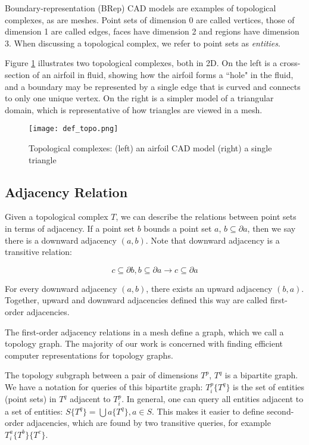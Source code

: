 Boundary-representation (BRep) CAD models are examples
of topological complexes, as are meshes.
Point sets of dimension 0 are called vertices, those
of dimension 1 are called edges, faces have dimension 2
and regions have dimension 3.
When discussing a topological complex, we
refer to point sets as \emph{entities}.

Figure \ref{fig:def_topo} illustrates two topological
complexes, both in 2D.
On the left is a cross-section of an airfoil in fluid,
showing how the airfoil forms a ``hole" in the fluid,
and a boundary may be represented by a single edge
that is curved and connects to only one unique vertex.
On the right is a simpler model of a triangular domain,
which is representative of how triangles are viewed
in a mesh.

\begin{figure}
\begin{center}
\texttt{[image: def\_topo.png]}
\caption{Topological complexes: (left) an airfoil CAD model (right)
a single triangle}
\label{fig:def_topo}
\end{center}
\end{figure}

\subsection{Adjacency Relation}
\label{sec:def_adj}

Given a topological complex $T$, we can describe the relations between
point sets in terms of adjacency.
If a point set $b$ bounds a point set $a$,
$b \subseteq \partial a$, then we say there is a
downward adjacency $(a,b)$.
Note that downward adjacency is a transitive relation:

\[c \subseteq \partial b, b \subseteq \partial a \to c \subseteq \partial a\]

For every downward adjacency $(a,b)$, there exists an upward
adjacency $(b,a)$.
Together, upward and downward adjacencies defined this way
are called first-order adjacencies.

The first-order adjacency relations in a mesh define a graph,
which we call a topology graph.
The majority of our work is concerned with finding
efficient computer representations for topology graphs.

The topology subgraph between a pair of dimensions $T^p$, $T^q$
is a bipartite graph.
We have a notation for queries of this bipartite graph:
$T^p_i\{T^q\}$ is the set of entities (point sets) in $T^q$ adjacent to
$T^p_i$.
In general, one can query all entities adjacent
to a set of entities: $S\{T^q\} = \bigcup a \{T^q\}, a \in S$.
This makes it easier to define second-order adjacencies,
which are found by two transitive queries,
for example $T^a_i\{T^b\}\{T^c\}$.

